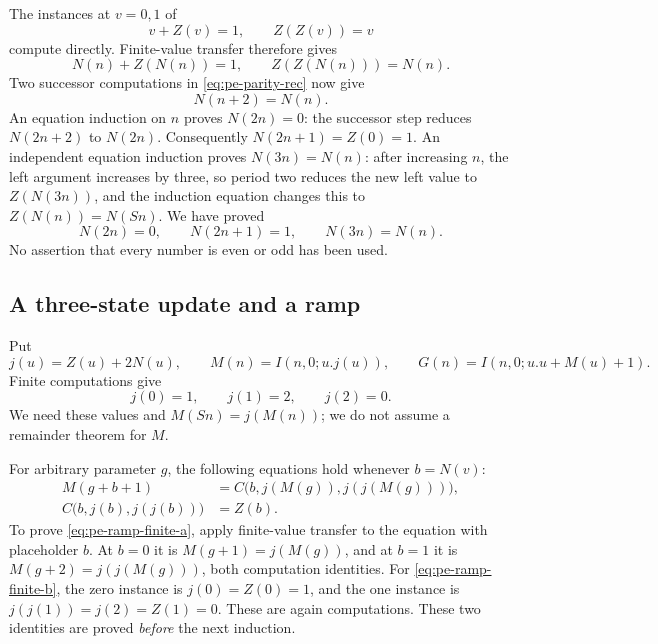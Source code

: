 The instances at $v=0,1$ of
\[
 v+Z(v)=1,\qquad Z(Z(v))=v
\]
compute directly.  Finite-value transfer therefore gives
\begin{equation}
 N(n)+Z(N(n))=1,\qquad Z(Z(N(n)))=N(n).
 \label{eq:pe-parity-bool}
\end{equation}
Two successor computations in \eqref{eq:pe-parity-rec} now give
\begin{equation}
 N(n+2)=N(n).\label{eq:pe-period-two}
\end{equation}
An equation induction on $n$ proves $N(2n)=0$: the successor step reduces
$N(2n+2)$ to $N(2n)$.  Consequently $N(2n+1)=Z(0)=1$.
An independent equation induction proves $N(3n)=N(n)$: after increasing
$n$, the left argument increases by three, so period two reduces the
new left value to $Z(N(3n))$, and the induction equation changes this to
$Z(N(n))=N(Sn)$.  We have proved
\begin{equation}
 N(2n)=0,\qquad N(2n+1)=1,\qquad N(3n)=N(n).
 \label{eq:pe-parity-scaling}
\end{equation}
No assertion that every number is even or odd has been used.

\subsection{A three-state update and a ramp}

Put
\[
 j(u)=Z(u)+2N(u),\qquad
 M(n)=I(n,0;u.j(u)),\qquad
 G(n)=I(n,0;u.u+M(u)+1).
\]
Finite computations give
\begin{equation}
 j(0)=1,\qquad j(1)=2,\qquad j(2)=0.
 \label{eq:pe-three-cycle}
\end{equation}
We need these values and $M(Sn)=j(M(n))$; we do not assume a remainder
theorem for $M$.

For arbitrary parameter $g$, the following equations hold whenever
$b=N(v)$:
\begin{align}
 M(g+b+1)&=C\bigl(b,j(M(g)),j(j(M(g)))\bigr),
    \label{eq:pe-ramp-finite-a}\\
 C\bigl(b,j(b),j(j(b))\bigr)&=Z(b).
    \label{eq:pe-ramp-finite-b}
\end{align}
To prove \eqref{eq:pe-ramp-finite-a}, apply finite-value transfer to the
equation with placeholder $b$.  At $b=0$ it is
$M(g+1)=j(M(g))$, and at $b=1$ it is
$M(g+2)=j(j(M(g)))$, both computation identities.  For
\eqref{eq:pe-ramp-finite-b}, the zero instance is
$j(0)=Z(0)=1$, and the one instance is
$j(j(1))=j(2)=Z(1)=0$.  These are again computations.  These two
identities are proved \emph{before} the next induction.

